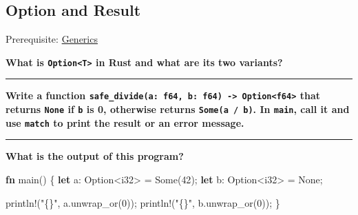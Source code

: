 \documentclass[
  11pt,
]{article}
\newenvironment{Shaded}{}{}
\newcommand{\ConstantTok}[1]{\textcolor[rgb]{0.53,0.00,0.00}{#1}}
\newcommand{\DataTypeTok}[1]{\textcolor[rgb]{0.56,0.13,0.00}{#1}}
\newcommand{\DecValTok}[1]{\textcolor[rgb]{0.25,0.63,0.44}{#1}}
\newcommand{\KeywordTok}[1]{\textcolor[rgb]{0.00,0.44,0.13}{\textbf{#1}}}
\newcommand{\NormalTok}[1]{#1}
\newcommand{\OperatorTok}[1]{\textcolor[rgb]{0.40,0.40,0.40}{#1}}
\newcommand{\PreprocessorTok}[1]{\textcolor[rgb]{0.74,0.48,0.00}{#1}}
\newcommand{\StringTok}[1]{\textcolor[rgb]{0.25,0.44,0.63}{#1}}
\begin{document}
\subsection{Option and Result}\label{option-and-result}

Prerequisite: \hyperref[generics]{Generics}

\textbf{What is \texttt{Option\textless{}T\textgreater{}} in Rust and
what are its two variants?}

\begin{center}\rule{0.5\linewidth}{0.5pt}\end{center}

\textbf{Write a function
\texttt{safe\_divide(a:\ f64,\ b:\ f64)\ -\textgreater{}\ Option\textless{}f64\textgreater{}}
that returns \texttt{None} if \texttt{b} is 0, otherwise returns
\texttt{Some(a\ /\ b)}. In \texttt{main}, call it and use \texttt{match}
to print the result or an error message.}

\begin{Shaded}
\begin{Highlighting}[]

\end{Highlighting}
\end{Shaded}

\begin{center}\rule{0.5\linewidth}{0.5pt}\end{center}

\textbf{What is the output of this program?}

\begin{Shaded}
\begin{Highlighting}[]
\KeywordTok{fn}\NormalTok{ main() }\OperatorTok{\{}
    \KeywordTok{let}\NormalTok{ a}\OperatorTok{:} \DataTypeTok{Option}\OperatorTok{\textless{}}\DataTypeTok{i32}\OperatorTok{\textgreater{}} \OperatorTok{=} \ConstantTok{Some}\NormalTok{(}\DecValTok{42}\NormalTok{)}\OperatorTok{;}
    \KeywordTok{let}\NormalTok{ b}\OperatorTok{:} \DataTypeTok{Option}\OperatorTok{\textless{}}\DataTypeTok{i32}\OperatorTok{\textgreater{}} \OperatorTok{=} \ConstantTok{None}\OperatorTok{;}

    \PreprocessorTok{println!}\NormalTok{(}\StringTok{"\{\}"}\OperatorTok{,}\NormalTok{ a}\OperatorTok{.}\NormalTok{unwrap\_or(}\DecValTok{0}\NormalTok{))}\OperatorTok{;}
    \PreprocessorTok{println!}\NormalTok{(}\StringTok{"\{\}"}\OperatorTok{,}\NormalTok{ b}\OperatorTok{.}\NormalTok{unwrap\_or(}\DecValTok{0}\NormalTok{))}\OperatorTok{;}
\OperatorTok{\}}
\end{Highlighting}
\end{Shaded}
\end{document}
